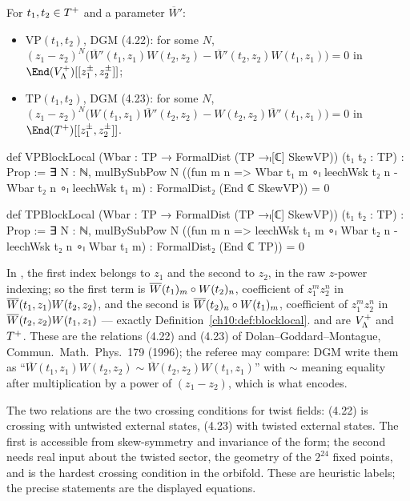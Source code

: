 \begin{definition}\label{ch10:def:blocklocal}
For $t_1,t_2\in T^{+}$ and a parameter $\overline W'$:
\begin{itemize}
\item $\mathrm{VP}(t_1,t_2)$, DGM (4.22): for some $N$,
  $(z_1-z_2)^N\bigl(\overline W'(t_1,z_1)W(t_2,z_2)-\overline W'(t_2,z_2)W(t_1,z_1)\bigr)=0$ in
  $\End(\chtenVP)[[z_1^\pm,z_2^\pm]]$;
\item $\mathrm{TP}(t_1,t_2)$, DGM (4.23): for some $N$,
  $(z_1-z_2)^N\bigl(W(t_1,z_1)\overline W'(t_2,z_2)-W(t_2,z_2)\overline W'(t_1,z_1)\bigr)=0$ in
  $\End(\chtenTP)[[z_1^\pm,z_2^\pm]]$.
\end{itemize}
\end{definition}
\begin{leancode}
def VPBlockLocal (Wbar : TP → FormalDist (TP →ₗ[ℂ] SkewVP)) (t₁ t₂ : TP) : Prop :=
  ∃ N : ℕ, mulBySubPow N
    ((fun m n => Wbar t₁ m ∘ₗ leechWsk t₂ n - Wbar t₂ n ∘ₗ leechWsk t₁ m) :
      FormalDist₂ (End ℂ SkewVP)) = 0

def TPBlockLocal (Wbar : TP → FormalDist (TP →ₗ[ℂ] SkewVP)) (t₁ t₂ : TP) : Prop :=
  ∃ N : ℕ, mulBySubPow N
    ((fun m n => leechWsk t₁ m ∘ₗ Wbar t₂ n - leechWsk t₂ n ∘ₗ Wbar t₁ m) :
      FormalDist₂ (End ℂ TP)) = 0
\end{leancode}
\begin{dictionary}
In , the first index  belongs to $z_1$
and the second  to $z_2$, in the raw $z$-power indexing; so the first term is
$\overline{W}(t_1)_m\circ W(t_2)_n$, coefficient of $z_1^mz_2^n$ in $\overline{W}(t_1,z_1)W(t_2,z_2)$, and the
second is $\overline{W}(t_2)_n\circ W(t_1)_m$, coefficient of $z_1^mz_2^n$ in
$\overline{W}(t_2,z_2)W(t_1,z_1)$ --- exactly Definition~\ref{ch10:def:blocklocal}.  
and  are $V_{\Lambda}^{+}$ and $T^{+}$.  These are the relations (4.22) and (4.23) of
Dolan--Goddard--Montague, Commun.\ Math.\ Phys.\ 179 (1996); the referee may compare: DGM write
them as ``$\overline W(t_1,z_1)W(t_2,z_2)\sim\overline W(t_2,z_2)W(t_1,z_1)$'' with $\sim$ meaning
equality after multiplication by a power of $(z_1-z_2)$, which is what  encodes.
\end{dictionary}

\begin{physics}
The two relations are the two crossing conditions for twist fields: (4.22) is crossing with untwisted external states, (4.23) with twisted external states. The first is accessible from skew-symmetry and invariance of the form; the second needs real input about the twisted sector, the geometry of the $2^{24}$ fixed points, and is the hardest crossing condition in the orbifold. These are heuristic labels; the precise statements are the displayed equations.
\end{physics}

